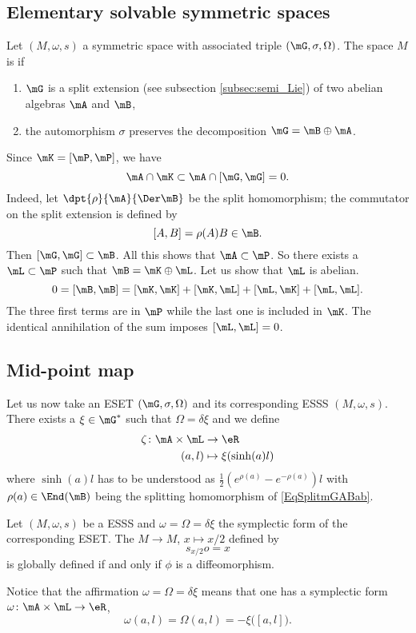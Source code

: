 \subsection{Elementary solvable symmetric spaces}

Let $(M,\omega,s)$ a symmetric space with associated triple $(\mG,\sigma,\Omega)$. The space $M$ is  if

\begin{enumerate}
\item $\mG$ is a split extension  (see subsection \ref{subsec:semi_Lie}) of two abelian algebras $\mA$ and $\mB$,
\item the automorphism $\sigma$ preserves the decomposition $\mG=\mB\oplus\mA$.
\end{enumerate}
Since $\mK=[\mP,\mP]$, we have
\[ 
  \mA\cap\mK\subset\mA\cap[\mG,\mG]=0.
\]
Indeed, let $\dpt{\rho}{\mA}{\Der\mB}$ be the split homomorphism; the commutator on the split extension is defined by
\[ 
  [A,B]=\rho(A)B\in\mB.
\]
Then $[\mG,\mG]\subset\mB$. All this shows that $\mA\subset\mP$. So there exists a $\mL\subset\mP$ such that $\mB=\mK\oplus\mL$. Let us show that $\mL$ is abelian.
\[ 
  0=[\mB,\mB]=[\mK,\mK]+[\mK,\mL]+[\mL,\mK]+[\mL,\mL].
\]
The three first terms are in $\mP$ while the last one is included in $\mK$. The identical annihilation of the sum imposes $[\mL,\mL]=0$.

\subsection{Mid-point map}

Let us now take an ESET $(\mG,\sigma,\Omega)$ and its corresponding ESSS $(M,\omega,s)$. There exists a $\xi\in\mG^*$ such that $\Omega=\delta\xi$ and we define
\begin{equation}
\begin{aligned}
 \zeta\colon \mA\times\mL&\to \eR \\ 
(a,l)&\mapsto \xi(\sinh(a)l) 
\end{aligned}
\end{equation}
where $\sinh(a)l$ has to be understood as $\frac{ 1 }{2}( e^{\rho(a)}- e^{-\rho(a)})l$ with $\rho(a)\in\End(\mB)$ being the splitting homomorphism of \eqref{EqSplitmGABab}. 
\begin{proposition}
Let $(M,\omega,s)$ be a ESSS and $\omega=\Omega=\delta\xi$ the symplectic form of the corresponding ESET. The  $M\to M$, $x\mapsto x/2$ defined by 
\[ 
  s_{x/2}o=x
\]
is globally defined if and only if $\phi$ is a diffeomorphism.
\end{proposition}
Notice that the affirmation $\omega=\Omega=\delta\xi$ means that one has a symplectic form $\omega\colon \mA\times\mL\to \eR$,
\[ 
  \omega(a,l)=\Omega(a,l)=-\xi\big( [a,l] \big).
\]

